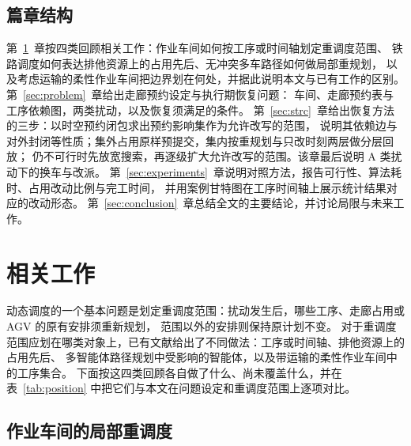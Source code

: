 \documentclass[manuscript,screen,review]{acmart}
\begin{document}
\subsection{篇章结构}

第~\ref{sec:related_work}~章按四类回顾相关工作：作业车间如何按工序或时间轴划定重调度范围、
铁路调度如何表达排他资源上的占用先后、无冲突多车路径如何做局部重规划，
以及考虑运输的柔性作业车间把边界划在何处，并据此说明本文与已有工作的区别。
第~\ref{sec:problem}~章给出走廊预约设定与执行期恢复问题：
车间、走廊预约表与工序依赖图，两类扰动，以及恢复须满足的条件。
第~\ref{sec:strc}~章给出恢复方法的三步：以时空预约闭包求出预约影响集作为允许改写的范围，
说明其依赖边与对外封闭等性质；集外占用原样预提交，集内按重规划与只改时刻两层做分层回放；
仍不可行时先放宽搜索，再逐级扩大允许改写的范围。该章最后说明 A 类扰动下的换车与改派。
第~\ref{sec:experiments}~章说明对照方法，报告可行性、算法耗时、占用改动比例与完工时间，
并用案例甘特图在工序时间轴上展示统计结果对应的改动形态。
第~\ref{sec:conclusion}~章总结全文的主要结论，并讨论局限与未来工作。

\section{相关工作}
\label{sec:related_work}


动态调度的一个基本问题是划定重调度范围：扰动发生后，哪些工序、走廊占用或 AGV 的原有安排须重新规划，
范围以外的安排则保持原计划不变。
对于重调度范围应划在哪类对象上，已有文献给出了不同做法：工序或时间轴、排他资源上的占用先后、
多智能体路径规划中受影响的智能体，以及带运输的柔性作业车间中的工序集合。
下面按这四类回顾各自做了什么、尚未覆盖什么，并在表~\ref{tab:position} 中把它们与本文在问题设定和重调度范围上逐项对比。

\subsection{作业车间的局部重调度}
\label{sec:rw_aor}
\end{document}
